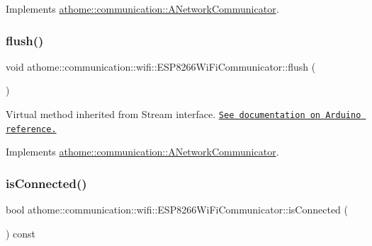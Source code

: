 Implements \mbox{\hyperlink{classathome_1_1communication_1_1_a_network_communicator_a025b7fbe9b3c4452fcf1925d766324eb}{athome\+::communication\+::\+A\+Network\+Communicator}}.

\mbox{\label{classathome_1_1communication_1_1wifi_1_1_e_s_p8266_wi_fi_communicator_af95ca7f47285b13fc895e0d9323ee320}} 
\subsubsection{\texorpdfstring{flush()}{flush()}}
{\footnotesize\ttfamily void athome\+::communication\+::wifi\+::\+E\+S\+P8266\+Wi\+Fi\+Communicator\+::flush (\begin{DoxyParamCaption}{ }\end{DoxyParamCaption})\hspace{0.3cm}{\ttfamily [virtual]}}

Virtual method inherited from Stream interface. \href{https://www.arduino.cc/reference/en/language/functions/communication/stream/streamflush/}{\tt See documentation on Arduino reference.} 

Implements \mbox{\hyperlink{classathome_1_1communication_1_1_a_network_communicator_a5e3b278ad11e6c00ac7d3e2fee3f01b1}{athome\+::communication\+::\+A\+Network\+Communicator}}.

\mbox{\label{classathome_1_1communication_1_1wifi_1_1_e_s_p8266_wi_fi_communicator_aefadac9b1a67d52853495dfabecad5fd}} 
\subsubsection{\texorpdfstring{is\+Connected()}{isConnected()}}
{\footnotesize\ttfamily bool athome\+::communication\+::wifi\+::\+E\+S\+P8266\+Wi\+Fi\+Communicator\+::is\+Connected (\begin{DoxyParamCaption}{ }\end{DoxyParamCaption}) const\hspace{0.3cm}{\ttfamily [virtual]}}

